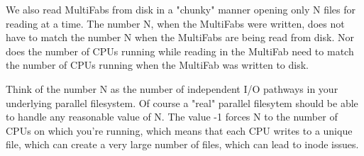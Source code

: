 We also read MultiFabs from disk in a "chunky" manner opening only N files for reading at a 
time.  The number N, when the MultiFabs were written, does not have to match the number N when 
the MultiFabs are being read from disk.  Nor does the number of CPUs running while reading in 
the MultiFab need to match the number of CPUs running when the MultiFab was written to disk.

Think of the number N as the number of independent I/O pathways in your underlying parallel 
filesystem.  Of course a "real" parallel filesytem should be able to handle any reasonable 
value of N.  The value -1 forces N to the number of CPUs on which you're running, which means 
that each CPU writes to a unique file, which can create a very large number of files, which 
can lead to inode issues.
